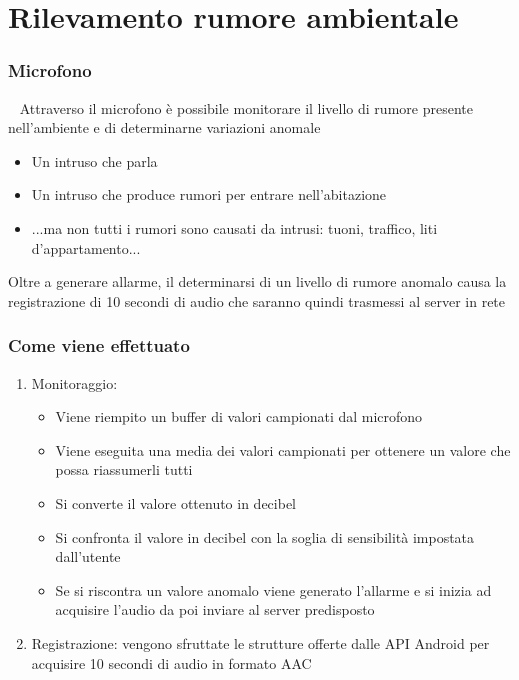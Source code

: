\documentclass{beamer}
\begin{document}
\section{Rilevamento rumore ambientale}
\begin{frame}
\frametitle{Microfono}
\begin{block}{~}
Attraverso il microfono è possibile monitorare il livello di rumore presente nell'ambiente e di determinarne variazioni anomale
\end{block}
\begin{itemize}
  \item Un intruso che parla 
  \item Un intruso che produce rumori per entrare nell'abitazione
  \item ...ma non tutti i rumori sono causati da intrusi: tuoni, traffico, liti d'appartamento...
\end{itemize}
Oltre a generare allarme, il determinarsi di un livello di rumore anomalo causa la registrazione di 10 secondi di audio che saranno quindi trasmessi al server in rete
\end{frame}

\begin{frame}
\frametitle{Come viene effettuato}
\begin{enumerate}
  \item Monitoraggio:
  \begin{itemize}
    \item Viene riempito un buffer di valori campionati dal microfono
    \item Viene eseguita una media dei valori campionati per ottenere un valore che possa riassumerli tutti
    \item Si converte il valore ottenuto in decibel
    \item Si confronta il valore in decibel con la soglia di sensibilità impostata dall'utente
    \item Se si riscontra un valore anomalo viene generato l'allarme e si inizia ad acquisire l'audio da poi inviare al server predisposto
  \end{itemize}
  \item Registrazione: vengono sfruttate le strutture offerte dalle API Android per acquisire 10 secondi di audio in formato AAC
\end{enumerate}
\end{frame}
\end{document}
